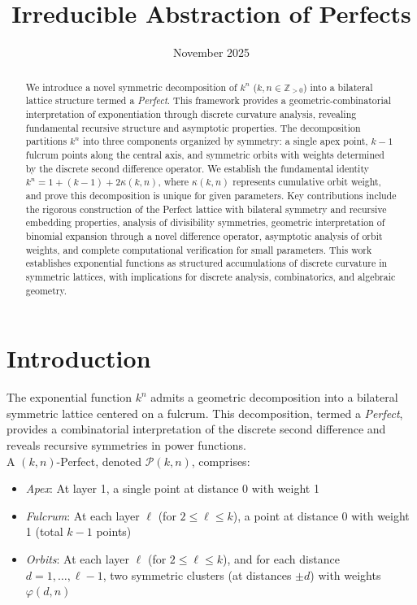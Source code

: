 \documentclass[11pt]{article}
\title{
  Irreducible Abstraction of Perfects \\[4pt]
}
\author{}
\date{November 2025 \\[32pt]}
\newcommand{\perfect}{\mathcal{P}}
\begin{document}
\maketitle

\begin{abstract}
We introduce a novel symmetric decomposition of $k^n$ ($k,n \in \mathbb{Z}_{>0}$) into a bilateral lattice structure termed a \emph{Perfect}. This framework provides a geometric-combinatorial interpretation of exponentiation through discrete curvature analysis, revealing fundamental recursive structure and asymptotic properties. The decomposition partitions $k^n$ into three components organized by symmetry: a single apex point, $k-1$ fulcrum points along the central axis, and symmetric orbits with weights determined by the discrete second difference operator. We establish the fundamental identity $k^n = 1 + (k-1) + 2\kappa(k,n)$, where $\kappa(k,n)$ represents cumulative orbit weight, and prove this decomposition is unique for given parameters. Key contributions include the rigorous construction of the Perfect lattice with bilateral symmetry and recursive embedding properties, analysis of divisibility symmetries, geometric interpretation of binomial expansion through a novel difference operator, asymptotic analysis of orbit weights, and complete computational verification for small parameters.
This work establishes exponential functions as structured accumulations of discrete curvature in symmetric lattices, with implications for discrete analysis, combinatorics, and algebraic geometry.
\end{abstract}

\newpage


\section{Introduction}\label{sec:introduction}

The exponential function $k^{n}$ admits a geometric decomposition into a bilateral symmetric lattice centered on a fulcrum. This decomposition, termed a \emph{Perfect}, provides a combinatorial interpretation of the discrete second difference and reveals recursive symmetries in power functions. \\

A $(k,n)$-Perfect, denoted $\perfect(k,n)$, comprises:
\begin{itemize}
    \item \emph{Apex}: At layer 1, a single point at distance 0 with weight 1
    \item \emph{Fulcrum}: At each layer $\ell$ (for $2 \leq \ell \leq k$), a point at distance 0 with weight 1 (total $k-1$ points)
    \item \emph{Orbits}: At each layer $\ell$ (for $2 \leq \ell \leq k$), and for each distance $d = 1, \dots, \ell-1$, two symmetric clusters (at distances $\pm d$) with weights $\varphi(d,n)$
\end{itemize}
\end{document}
